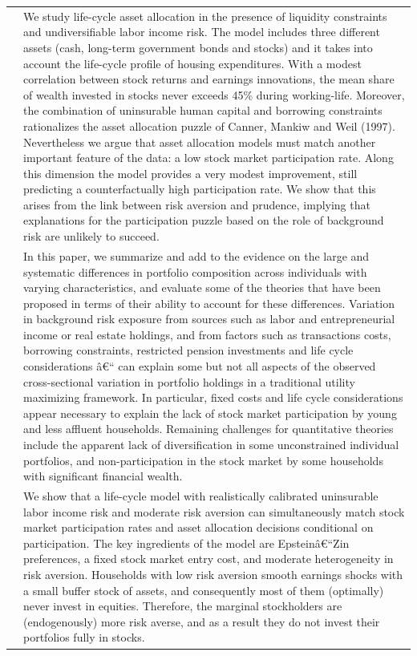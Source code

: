\documentclass{article}
\begin{document}
\begin{tabular}{p{}p{}}
\cite{Gomes_2002} & We study life-cycle asset allocation in the presence of liquidity constraints and undiversifiable labor income risk. The model includes three different assets (cash, long-term government bonds and stocks) and it takes into account the life-cycle profile of housing expenditures. With a modest correlation between stock returns and earnings innovations, the mean share of wealth invested in stocks never exceeds 45\% during working-life. Moreover, the combination of uninsurable human capital and borrowing constraints rationalizes the asset allocation puzzle of Canner, Mankiw and Weil (1997). Nevertheless we argue that asset allocation models must match another important feature of the data: a low stock market participation rate. Along this dimension the model provides a very modest improvement, still predicting a counterfactually high participation rate. We show that this arises from the link between risk aversion and prudence, implying that explanations for the participation puzzle based on the role of background risk are unlikely to succeed. \\
\cite{Curcuru_2010} & In this paper, we summarize and add to the evidence on the large and systematic differences in portfolio composition across individuals with varying characteristics, and evaluate some of the theories that have been proposed in terms of their ability to account for these differences. Variation in background risk exposure from sources such as labor and entrepreneurial income or real estate holdings, and from factors such as transactions costs, borrowing constraints, restricted pension investments and life cycle considerations â€`` can explain some but not all aspects of the observed cross-sectional variation in portfolio holdings in a traditional utility maximizing framework. In particular, fixed costs and life cycle considerations appear necessary to explain the lack of stock market participation by young and less affluent households. Remaining challenges for quantitative theories include the apparent lack of diversification in some unconstrained individual portfolios, and non-participation in the stock market by some households with significant financial wealth. \\
\cite{GOMES_2005} & We show that a life-cycle model with realistically calibrated uninsurable labor income risk and moderate risk aversion can simultaneously match stock market participation rates and asset allocation decisions conditional on participation. The key ingredients of the model are Epsteinâ€``Zin preferences, a fixed stock market entry cost, and moderate heterogeneity in risk aversion. Households with low risk aversion smooth earnings shocks with a small buffer stock of assets, and consequently most of them (optimally) never invest in equities. Therefore, the marginal stockholders are (endogenously) more risk averse, and as a result they do not invest their portfolios fully in stocks. \\

\end{tabular}
\end{document}

